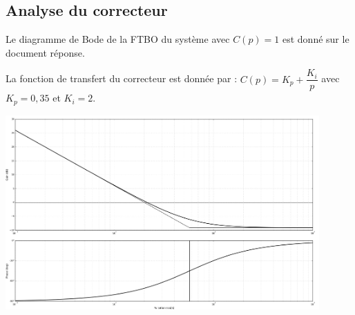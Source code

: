 \subsection{Analyse du correcteur}
Le diagramme de Bode de la FTBO du système avec $C(p)=1$ est donné sur le document réponse. 
%

\ifprof
\begin{corrige}
\end{corrige}
\else
\fi

La fonction de transfert du correcteur est donnée par : $C(p)=K_p + \dfrac{K_i}{p}$ avec $K_p = 0,35$ et $K_i = 2$.

\ifprof
\begin{corrige}
\includegraphics[width=0.9\textwidth]{images/bode_PI.png}
\end{corrige}
\else
\fi


